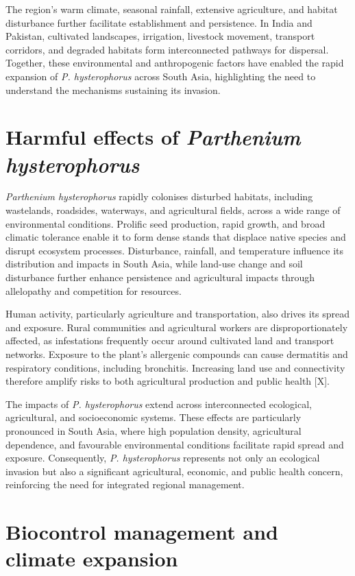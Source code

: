 The region's warm climate, seasonal rainfall, extensive agriculture, and habitat disturbance further facilitate establishment and persistence. In India and Pakistan, cultivated landscapes, irrigation, livestock movement, transport corridors, and degraded habitats form interconnected pathways for dispersal. Together, these environmental and anthropogenic factors have enabled the rapid expansion of \textit{P. hysterophorus} across South Asia, highlighting the need to understand the mechanisms sustaining its invasion.

\section{Harmful effects of \textit{Parthenium hysterophorus}}

\textit{Parthenium hysterophorus} rapidly colonises disturbed habitats, including wastelands, roadsides, waterways, and agricultural fields, across a wide range of environmental conditions. Prolific seed production, rapid growth, and broad climatic tolerance enable it to form dense stands that displace native species and disrupt ecosystem processes. Disturbance, rainfall, and temperature influence its distribution and impacts in South Asia, while land-use change and soil disturbance further enhance persistence and agricultural impacts through allelopathy and competition for resources.

Human activity, particularly agriculture and transportation, also drives its spread and exposure. Rural communities and agricultural workers are disproportionately affected, as infestations frequently occur around cultivated land and transport networks. Exposure to the plant's allergenic compounds can cause dermatitis and respiratory conditions, including bronchitis. Increasing land use and connectivity therefore amplify risks to both agricultural production and public health [X].

The impacts of \textit{P. hysterophorus} extend across interconnected ecological, agricultural, and socioeconomic systems. These effects are particularly pronounced in South Asia, where high population density, agricultural dependence, and favourable environmental conditions facilitate rapid spread and exposure. Consequently, \textit{P. hysterophorus} represents not only an ecological invasion but also a significant agricultural, economic, and public health concern, reinforcing the need for integrated regional management.

\section{Biocontrol management and climate expansion}

